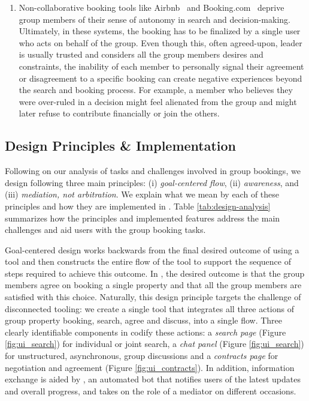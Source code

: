 \begin{enumerate}[label={}, leftmargin=0cm, itemindent=0.2cm]
\item \cLackOfAutonomy 
Non-collaborative booking tools like Airbnb~\cite{airbnb} and Booking.com~\cite{booking} deprive group members of their sense of autonomy in search and decision-making. Ultimately, in these systems, the booking has to be finalized by a single user who acts on behalf of the group. Even though this, often agreed-upon, leader is usually trusted and considers all the group members desires and constraints, the inability of each member to personally signal their agreement or disagreement to a specific booking can create negative experiences beyond the search and booking process. For example, a member who believes they were over-ruled in a decision might feel alienated from the group and might later refuse to contribute financially or join the others.  

    
    
\end{enumerate}

\subsection{Design Principles \& Implementation}
\label{ssection:principles}

Following on our analysis of tasks and challenges involved in group bookings, we design \tool following three main principles: (i) \textit{goal-centered flow}, (ii) \textit{awareness}, and (iii) \textit{mediation, not arbitration}. We explain what we mean by each of these principles and how they are implemented in \tool. Table \ref{tab:design-analysis} summarizes how the principles and implemented features address the main challenges and aid users with the group booking tasks.




\pGoalCenteredFlow Goal-centered design works backwards from the final desired outcome of using a tool and then constructs the entire flow of the tool to support the sequence of steps required to achieve this outcome. In \tool, the desired outcome is that the group members agree on booking a single property and that all the group members are satisfied with this choice. Naturally, this design principle targets the challenge of disconnected tooling: we create a single tool that integrates all three actions of group property booking, search, agree and discuss, into a single flow. Three clearly identifiable components in \tool codify these actions: a \textit{search page} (Figure \ref{fig:ui_search}) for individual or joint search, a \textit{chat panel} (Figure \ref{fig:ui_search}) for unstructured, asynchronous, group discussions and a \textit{contracts page} for negotiation and agreement (Figure \ref{fig:ui_contracts}). In addition, information exchange is aided by \cbot, an automated bot that notifies users of the latest updates and overall progress, and takes on the role of a mediator on different occasions.



